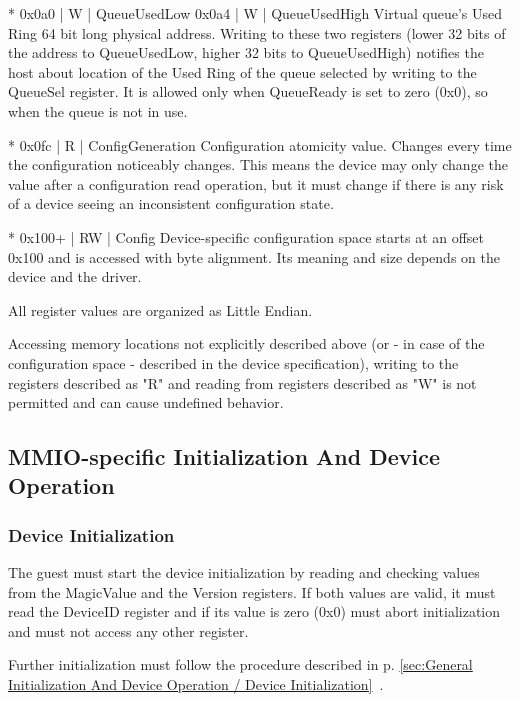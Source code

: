 * 0x0a0 | W | QueueUsedLow
  0x0a4 | W | QueueUsedHigh
  Virtual queue's Used Ring 64 bit long physical address.
  Writing to these two registers (lower 32 bits of the address
  to QueueUsedLow, higher 32 bits to QueueUsedHigh) notifies
  the host about location of the Used Ring of the queue
  selected by writing to the QueueSel register. It is allowed
  only when QueueReady is set to zero (0x0), so when the queue
  is not in use.

* 0x0fc | R | ConfigGeneration
  Configuration atomicity value.
  Changes every time the configuration noticeably changes. This
  means the device may only change the value after a configuration
  read operation, but it must change if there is any risk of a
  device seeing an inconsistent configuration state.

* 0x100+ | RW | Config
  Device-specific configuration space starts at an offset 0x100
  and is accessed with byte alignment. Its meaning and size
  depends on the device and the driver.

All register values are organized as Little Endian.

Accessing memory locations not explicitly described above (or
- in case of the configuration space - described in the device
specification), writing to the registers described as "R" and
reading from registers described as "W" is not permitted and
can cause undefined behavior.

\subsection{MMIO-specific Initialization And Device Operation}\label{sec:Virtio Transport Options / Virtio Over MMIO / MMIO-specific Initialization And Device Operation}

\subsubsection{Device Initialization}\label{sec:Virtio Transport Options / Virtio Over MMIO / MMIO-specific Initialization And Device Operation / Device Initialization}

The guest must start the device initialization by reading and
checking values from the MagicValue and the Version registers.
If both values are valid, it must read the DeviceID register
and if its value is zero (0x0) must abort initialization and
must not access any other register.

Further initialization must follow the procedure described in
p. \ref{sec:General Initialization And Device Operation / Device Initialization}~.

